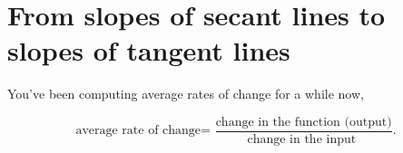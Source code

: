 \documentclass{ximera}
\begin{document}
\section{From slopes of secant lines to slopes of tangent lines}

You've been computing average rates of change for a while now, 

\[
{\text{average rate of change=
    }}
\frac{\text{change in the function (output)}}{\text{change in the input 
   }}.
\]
\begin{comment}
 how exactly does one find the function that will give the
instantaneous rate of change? Recall that the instantaneous rate of change
of a line is the slope of the line.  Hence the instantaneous rate of
change of a function is the slope of the tangent line. For now,
consider the following informal definition of a \textit{tangent line}:
\begin{quote}\index{tangent line}
Given a function $f$ and a number $a$ in the domain of $f$, if one can ``zoom in''
on the graph at $(a, f(a))$ sufficiently so that it appears to be a straight line,
then that line is the \dfn{tangent line} to $f(x)$ at the point $(a,f(a))$.
\end{quote}
We illustrate this informal definition with the following diagram:
\begin{image}
\begin{tikzpicture}
  \begin{axis}[
            domain=0:6, range=0:7,
            ymin=-.2,ymax=7,
            width=6in,
            height=2.5in, %
            axis lines=none,
          ]   
          \addplot [draw=none, fill=textColor!10!background] plot coordinates {(.8,1.6) (2.834,5)} \closedcycle; %
          \addplot [draw=none, fill=textColor!10!background] plot coordinates {(2.834,5) (4.166,5)} \closedcycle; %
          \addplot [draw=none, fill=background] plot coordinates {(1.2,1.6) (4.166,5)} \closedcycle; %
          \addplot [draw=none, fill=background] plot coordinates {(.8,1.6) (1.2,1.6)} \closedcycle; %

          \addplot [draw=none, fill=textColor!10!background] plot coordinates {(3.3,3.6) (5.334,5)} \closedcycle; %
          \addplot [draw=none, fill=textColor!10!background] plot coordinates {(5.334,5) (6.666,5)} \closedcycle; %
          \addplot [draw=none, fill=background] plot coordinates {(3.7,3.6) (6.666,5)} \closedcycle; %
          \addplot [draw=none, fill=background] plot coordinates {(3.3,3.6) (3.7,3.6)} \closedcycle; %
          

\end{comment}
\end{document}

